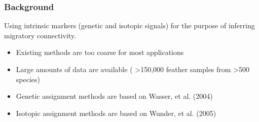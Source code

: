 \documentclass[t]{beamer}\usepackage[]{graphicx}\usepackage[]{color}
\begin{document}
\begin{frame}
\frametitle{Background}

Using intrinsic markers (genetic and isotopic signals) for the purpose of inferring migratory connectivity.

\vspace{2mm}

\begin{itemize}
\item Existing methods are too coarse for most applications
\vspace{2mm}
\item Large amounts of data are available ( \textgreater{}150,000 feather samples from \textgreater{}500 species)
\vspace{2mm}
\item Genetic assignment methods are based on Wasser, et al. (2004)
\vspace{2mm}
\item Isotopic assignment methods are based on Wunder, et al. (2005)
\end{itemize}

\end{frame}

\end{document}
